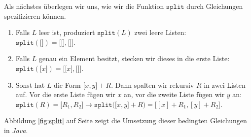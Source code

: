\noindent
Als n\"achstes \"uberlegen wir uns, wie wir die Funktion $\texttt{split}$ durch Gleichungen spezifizieren k\"onnen.
\begin{enumerate}
\item Falls $L$ leer ist, produziert $\mathtt{split}(L)$ zwei leere Listen:\\[0.1cm]
      \hspace*{1.3cm} 
      $\mathtt{split}(\texttt{[]}) = \mathtt{[} \texttt{[]}, \texttt{[]} \mathtt{]}$.
\item Falls $L$ genau ein Element besitzt, stecken wir dieses in die erste Liste: \\[0.1cm]
      \hspace*{1.3cm} 
      $\mathtt{split}(\mathtt{[}x\mathtt{]}) = \mathtt{[} \texttt{[}x\texttt{]}, \texttt{[]} \mathtt{]}$.
\item Sonst hat $L$ die Form $\mathtt{[}x, y\mathtt{]} + R$.
      Dann spalten wir rekursiv $R$ in zwei Listen auf. Vor die erste Liste f\"ugen wir $x$ an,
      vor die zweite Liste f\"ugen wir $y$ an:
      \\[0.1cm]
      \hspace*{1.3cm} 
      $\mathtt{split}(R) = \mathtt{[}R_1, R_2\mathtt{]} \rightarrow
      \mathtt{split}\bigl(\mathtt{[}x, y\mathtt{]} + R\bigr) = \bigl[ [x] + R_1, [y] + R_2 \bigr]$.
\end{enumerate}
Abbildung \ref{fig:split} auf Seite \pageref{fig:split} 
zeigt die Umsetzung dieser bedingten Gleichungen in \textsl{Java}.


